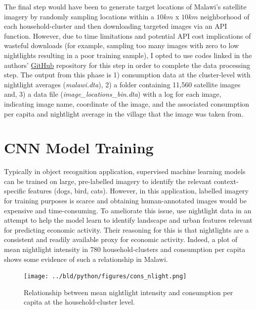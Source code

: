 \documentclass[11pt, a4paper, leqno]{article}
\begin{document}
 The final step would have been to generate target locations of Malawi's satellite imagery by randomly sampling locations within a $10km$ x $10km$ neighborhood of each household-cluster and then downloading  targeted images via an API function. However, due to time limitations and potential API cost implications of wasteful downloads (for example, sampling too many images with zero to low nightlights resulting in a poor training sample), I opted to use codes linked in the authors' \href{https://github.com/nealjean/predicting-poverty}{GitHub} repository for this step in order to complete the data processing step. The output from this phase is 1) consumption data at the cluster-level with nightlight averages (\textit{malawi.dta}), 2) a folder containing 11,560 satellite images and, 3) a data file (\textit{image\_locations\_bin.dta}) with a log for each image, indicating image name, coordinate of the image, and the associated consumption per capita and  nightlight average in the village that the image was taken from.

\section{CNN Model Training}

 Typically in object recognition application, supervised machine learning models can be trained on large, pre-labelled imagery to identify the relevant context-specific features (dogs, bird, cats). However, in this application, labelled imagery for training purposes is scarce and obtaining human-annotated images would be expensive and time-consuming. To ameliorate this issue, \citet{jean2016combining} use nightlight data in an attempt to help the model learn to identify landscape and urban features relevant for predicting economic activity. Their reasoning for this is that nightlights are a consistent and readily available proxy for economic activity. Indeed, a plot of mean nightlight intensity in 780 household-clusters and consumption per capita shows some evidence of such a relationship in Malawi.

\begin{figure}[H]

\centering
    \texttt{[image: ../bld/python/figures/cons\_nlight.png]}
    \caption{Relationship between mean nightlight intensity and consumption per capita at the household-cluster level.}
    \label{fig:python-predictions}

\end{figure}
\end{document}
